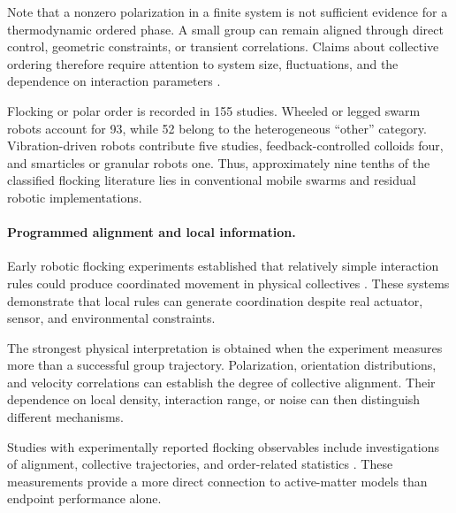 Note that a nonzero polarization in a finite
system is not sufficient evidence for a
thermodynamic ordered phase. A small group can
remain aligned through direct control, geometric
constraints, or transient correlations. Claims
about collective ordering therefore require
attention to system size, fluctuations, and
the dependence on interaction parameters
\cite{Vicsek1995novel}
\cite{Toner1995longrange}.

Flocking or polar order is recorded in 155
studies. Wheeled or legged swarm robots account
for 93, while 52 belong to the heterogeneous
``other'' category. Vibration-driven robots
contribute five studies, feedback-controlled
colloids four, and smarticles or granular
robots one. Thus, approximately nine tenths
of the classified flocking literature lies
in conventional mobile swarms and residual
robotic implementations.



\paragraph*{Programmed alignment and local information.}

Early robotic flocking experiments established
that relatively simple interaction rules could
produce coordinated movement in physical
collectives
\cite{Hayes2003selforganizedflock,Kelly2004ascalableonboard,Regmi2005experimentalimpleme,Sugawara2006collectivemotionan,Turgut2008modelingphasetrans,Turgut2008selforganizedflocka,Navarro2008anapproachtoflock,Turgut2008selforganizedflockb,Wang2008alocalsensorbased,Gu2009leaderfollowerfloc,Wang2009leaderfollowerfloc,Gke2010theprosandconsof,Miki2010asimplerulebased,Ercan2011swarmrobotflocking,Tarcai2011patternstransition,Fine2011flockingdontneed,Hauert2011reynoldsflockingin}.
These systems demonstrate that local rules can
generate coordination despite real actuator,
sensor, and environmental constraints.

The strongest physical interpretation is obtained
when the experiment measures more than a successful
group trajectory. Polarization, orientation
distributions, and velocity correlations can
establish the degree of collective alignment.
Their dependence on local density, interaction
range, or noise can then distinguish different
mechanisms.

Studies with experimentally reported flocking
observables include investigations of alignment,
collective trajectories, and order-related
statistics
\cite{Tarcai2011patternstransition,Virgh2014flockingalgorithmf,Vsrhelyi2014outdoorflockingand,Zoss2018distributedsystemo,Vsrhelyi2018optimizedflockingo,Berlinger2021selforganizedevasi,Barone2024experimentalandnum,Zhou2024anticipationpromote,Castro2025visualcollectivebe,Paramanick2025spontaneousemergenc}.
These measurements provide a more direct connection
to active-matter models than endpoint performance
alone.



